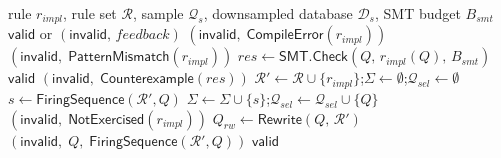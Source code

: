 \begin{algorithm}[t]\fontsize{7.9}{0}
\caption{\textsf{Verify}$(r_{\mathit{impl}}, \mathcal{R}, \mathcal{Q}_s, \mathcal{D}_s)$}
\label{alg:verify}
\begin{algorithmic}[1]
\REQUIRE rule $r_{\mathit{impl}}$, rule set $\mathcal{R}$, sample $\mathcal{Q}_s$, downsampled database $\mathcal{D}_s$, SMT budget $B_{\mathit{smt}}$
\ENSURE $\mathsf{valid}$ or $(\mathsf{invalid},\, \mathit{feedback})$
  \RETURN $(\mathsf{invalid},\;\textsf{CompileError}(r_{\mathit{impl}}))$
\ENDIF
{}
  \RETURN $(\mathsf{invalid},\;\textsf{PatternMismatch}(r_{\mathit{impl}}))$
\ENDIF
{}
\STATE \label{verify:smt} $\mathit{res} \leftarrow \textsf{SMT.Check}(Q,\, r_{\mathit{impl}}(Q),\, B_{\mathit{smt}})$ 
  \RETURN $\mathsf{valid}$ 
  \RETURN $(\mathsf{invalid},\;\textsf{Counterexample}(\mathit{res}))$
\ENDIF
{}
\STATE $\mathcal{R}' \leftarrow \mathcal{R} \cup \{r_{\mathit{impl}}\}$;\quad$\Sigma \leftarrow \emptyset$;\quad$\mathcal{Q}_{\mathit{sel}} \leftarrow \emptyset$
  \STATE $s \leftarrow \textsf{FiringSequence}(\mathcal{R}', Q)$
    \STATE $\Sigma \leftarrow \Sigma \cup \{s\}$;\quad$\mathcal{Q}_{\mathit{sel}} \leftarrow \mathcal{Q}_{\mathit{sel}} \cup \{Q\}$ 
  \ENDIF
\ENDFOR
{}
  \RETURN $(\mathsf{invalid},\;\textsf{NotExercised}(r_{\mathit{impl}}))$
\ENDIF
{}
  \STATE $Q_{\mathit{rw}} \leftarrow \textsf{Rewrite}(Q,\, \mathcal{R}')$ 
    \RETURN $(\mathsf{invalid},\;Q,\;\textsf{FiringSequence}(\mathcal{R}', Q))$
  \ENDIF
\ENDFOR
\RETURN $\mathsf{valid}$
\end{algorithmic}
\end{algorithm}


